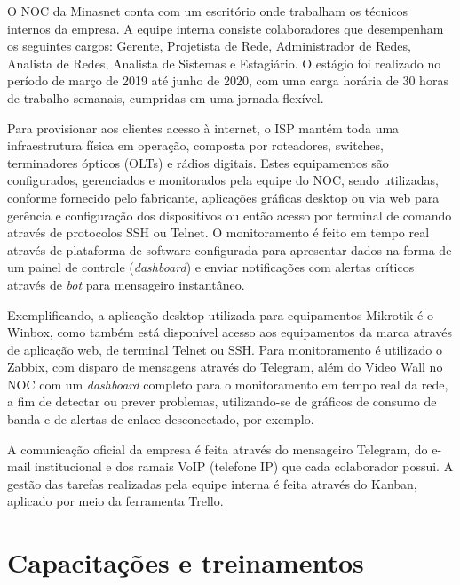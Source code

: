     O NOC da Minasnet conta com um escritório onde trabalham os técnicos internos da empresa. A equipe interna consiste colaboradores que desempenham os seguintes cargos: Gerente, Projetista de Rede, Administrador de Redes, Analista de Redes, Analista de Sistemas e Estagiário. O estágio foi realizado no período de março de 2019 até junho de 2020, com uma carga horária de 30 horas de trabalho semanais, cumpridas em uma jornada flexível.

    Para provisionar aos clientes acesso à internet, o ISP mantém toda uma infraestrutura física em operação, composta por roteadores, switches, terminadores ópticos (OLTs) e rádios digitais. Estes equipamentos são configurados, gerenciados e monitorados pela equipe do NOC, sendo utilizadas, conforme fornecido pelo fabricante, aplicações gráficas desktop ou via web para gerência e configuração dos dispositivos ou então acesso por terminal de comando através de protocolos SSH ou Telnet. O monitoramento é feito em tempo real através de plataforma de software configurada para apresentar dados na forma de um painel de controle (\textit{dashboard}) e enviar notificações com alertas críticos através de \textit{bot} para mensageiro instantâneo.
    
    Exemplificando, a aplicação desktop utilizada para equipamentos Mikrotik é o Winbox, como também está disponível acesso aos equipamentos da marca através de aplicação web, de terminal Telnet ou SSH. Para monitoramento é utilizado o Zabbix, com disparo de mensagens através do Telegram, além do Video Wall no NOC com um \textit{dashboard} completo para o monitoramento em tempo real da rede, a fim de detectar ou prever problemas, utilizando-se de gráficos de consumo de banda e de alertas de enlace desconectado, por exemplo.

    A comunicação oficial da empresa é feita através do mensageiro Telegram, do e-mail institucional e dos ramais VoIP (telefone IP) que cada colaborador possui. A gestão das tarefas realizadas pela equipe interna é feita através do Kanban, aplicado por meio da ferramenta Trello.

\section{Capacitações e treinamentos}

